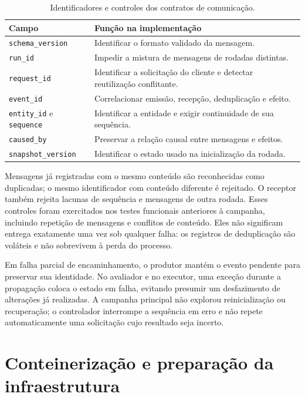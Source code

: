 \begin{table}[htbp]
\centering\small
\caption{Identificadores e controles dos contratos de comunicação.}
\label{tab:contratos-estado}
\begin{tabularx}{\linewidth}{@{}p{3.3cm}X@{}}
\toprule
Campo & Função na implementação \\
\midrule
\texttt{schema\_version} & Identificar o formato validado da mensagem. \\
\texttt{run\_id} & Impedir a mistura de mensagens de rodadas distintas. \\
\texttt{request\_id} & Identificar a solicitação do cliente e detectar reutilização conflitante. \\
\texttt{event\_id} & Correlacionar emissão, recepção, deduplicação e efeito. \\
\texttt{entity\_id} e \texttt{sequence} & Identificar a entidade e exigir continuidade de sua sequência. \\
\texttt{caused\_by} & Preservar a relação causal entre mensagens e efeitos. \\
\texttt{snapshot\_version} & Identificar o estado usado na inicialização da rodada. \\
\bottomrule
\end{tabularx}
\fonte{}
\end{table}

Mensagens já registradas com o mesmo conteúdo são reconhecidas como duplicadas; o mesmo identificador com conteúdo diferente é rejeitado. O receptor também rejeita lacunas de sequência e mensagens de outra rodada. Esses controles foram exercitados nos testes funcionais anteriores à campanha, incluindo repetição de mensagens e conflitos de conteúdo. Eles não significam entrega exatamente uma vez sob qualquer falha: os registros de deduplicação são voláteis e não sobrevivem à perda do processo.

Em falha parcial de encaminhamento, o produtor mantém o evento pendente para preservar sua identidade. No avaliador e no executor, uma exceção durante a propagação coloca o estado em falha, evitando presumir um desfazimento de alterações já realizadas. A campanha principal não explorou reinicialização ou recuperação; o controlador interrompe a sequência em erro e não repete automaticamente uma solicitação cujo resultado seja incerto.

\section{Conteinerização e preparação da infraestrutura}

